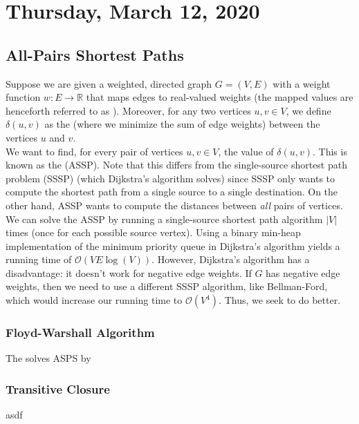\newpage
\section{Thursday, March 12, 2020}

\subsection{All-Pairs Shortest Paths}

Suppose we are given a weighted, directed graph $G = (V, E)$ with a weight function $w : E \rightarrow \mathbb{R}$ that maps edges to real-valued weights (the mapped values are henceforth referred to as ). Moreover, for any two vertices $u, v\in V$, we define $\delta(u, v)$ as the  (where we minimize the sum of edge weights) between the vertices $u$ and $v$. \\

We want to find, for every pair of vertices $u, v \in V$, the value of $\delta(u, v)$. This is known as the  (ASSP). Note that this differs from the single-source shortest path problem (SSSP) (which Dijkstra's algorithm solves) since SSSP only wants to compute the shortest path from a single source to a single destination. On the other hand, ASSP wants to compute the distances between \textit{all} pairs of vertices. \\

We can solve the ASSP by running a single-source shortest path algorithm $|V|$ times (once for each possible source vertex). Using a binary min-heap implementation of the minimum priority queue in Dijkstra's algorithm yields a running time of $\mathcal{O}(VE\log(V))$. However, Dijkstra's algorithm has a disadvantage: it doesn't work for negative edge weights. If $G$ has negative edge weights, then we need to use a different SSSP algorithm, like Bellman-Ford, which would increase our running time to $\mathcal{O}(V^4).$ Thus, we seek to do better.


\subsubsection{Floyd-Warshall Algorithm}

The  solves ASPS by 

\subsubsection{Transitive Closure}

asdf
